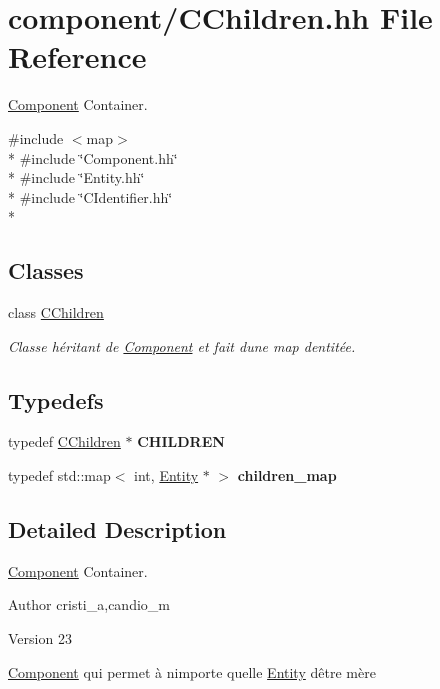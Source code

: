 \hypertarget{_c_children_8hh}{}\section{component/\+C\+Children.hh File Reference}
\label{_c_children_8hh}


\hyperlink{class_component}{Component} Container.  


{\ttfamily \#include $<$map$>$}\\*
{\ttfamily \#include \char`\"{}Component.\+hh\char`\"{}}\\*
{\ttfamily \#include \char`\"{}Entity.\+hh\char`\"{}}\\*
{\ttfamily \#include \char`\"{}C\+Identifier.\+hh\char`\"{}}\\*
\subsection*{Classes}
\begin{DoxyCompactItemize}
\item 
class \hyperlink{class_c_children}{C\+Children}
\begin{DoxyCompactList}\small\item\em Classe héritant de \hyperlink{class_component}{Component} et fait d\textquotesingle{}une map d\textquotesingle{}entitée. \end{DoxyCompactList}\end{DoxyCompactItemize}
\subsection*{Typedefs}
\begin{DoxyCompactItemize}
\item 
\hypertarget{_c_children_8hh_aede5de0891d479a8adf634296eefff11}{}typedef \hyperlink{class_c_children}{C\+Children} $\ast$ {\bfseries C\+H\+I\+L\+D\+R\+E\+N}\label{_c_children_8hh_aede5de0891d479a8adf634296eefff11}

\item 
\hypertarget{_c_children_8hh_a6e49447c2078936f847595937d905e3d}{}typedef std\+::map$<$ int, \hyperlink{class_entity}{Entity} $\ast$ $>$ {\bfseries children\+\_\+map}\label{_c_children_8hh_a6e49447c2078936f847595937d905e3d}

\end{DoxyCompactItemize}


\subsection{Detailed Description}
\hyperlink{class_component}{Component} Container. 

\begin{DoxyAuthor}{Author}
cristi\+\_\+a,candio\+\_\+m 
\end{DoxyAuthor}
\begin{DoxyVersion}{Version}
23
\end{DoxyVersion}
\hyperlink{class_component}{Component} qui permet à n\textquotesingle{}importe qu\textquotesingle{}elle \hyperlink{class_entity}{Entity} d\textquotesingle{}être mère 